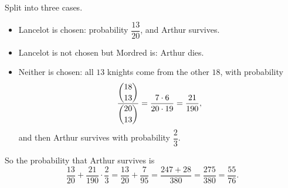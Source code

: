 Split into three cases.
\begin{itemize}
\item Lancelot is chosen: probability $\dfrac{13}{20}$, and Arthur survives.
\item Lancelot is not chosen but Mordred is: Arthur dies.
\item Neither is chosen: all $13$ knights come from the other $18$, with probability
\[\dfrac{\dbinom{18}{13}}{\dbinom{20}{13}}=\dfrac{7\cdot6}{20\cdot19}=\dfrac{21}{190},\]
and then Arthur survives with probability $\dfrac23$.
\end{itemize}
So the probability that Arthur survives is
\[\dfrac{13}{20}+\dfrac{21}{190}\cdot\dfrac23=\dfrac{13}{20}+\dfrac{7}{95}=\dfrac{247+28}{380}=\dfrac{275}{380}=\boxed{\dfrac{55}{76}}.\]
